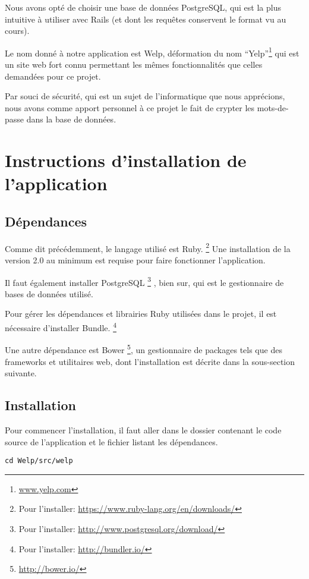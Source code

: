 \documentclass[a4paper,10pt]{article}
\begin{document}
Nous avons opté de choisir une base de données PostgreSQL, qui est la plus intuitive à utiliser avec Rails (et dont les requêtes conservent le format vu au cours).

Le nom donné à notre application est Welp, déformation du nom ``Yelp''\footnote{\url{www.yelp.com}} qui est un site web fort connu permettant les mêmes fonctionnalités que celles demandées pour ce projet.

Par souci de sécurité, qui est un sujet de l'informatique que nous apprécions, nous avons comme apport personnel à ce projet le fait de crypter les mots-de-passe dans la base de données.

\section{Instructions d'installation de l'application}

\subsection{Dépendances}

Comme dit précédemment, le langage utilisé est Ruby. \footnote{Pour l'installer: \url{https://www.ruby-lang.org/en/downloads/} } Une installation de la version 2.0 au minimum est requise pour faire fonctionner l'application.

Il faut également installer PostgreSQL \footnote{Pour l'installer: \url{http://www.postgresql.org/download/} } , bien sur, qui est le gestionnaire de bases de données utilisé.

Pour gérer les dépendances et librairies Ruby utilisées dans le projet, il est nécessaire d'installer Bundle. \footnote{Pour l'installer: \url{http://bundler.io/} }

Une autre dépendance est Bower \footnote{\url{http://bower.io/}}, un gestionnaire de packages tels que des frameworks et utilitaires web, dont l'installation est décrite dans la sous-section suivante.

\subsection{Installation}

Pour commencer l'installation, il faut aller dans le dossier contenant le code source de l'application et le fichier listant les dépendances.

\begin{verbatim}
cd Welp/src/welp
\end{verbatim}
\end{document}
